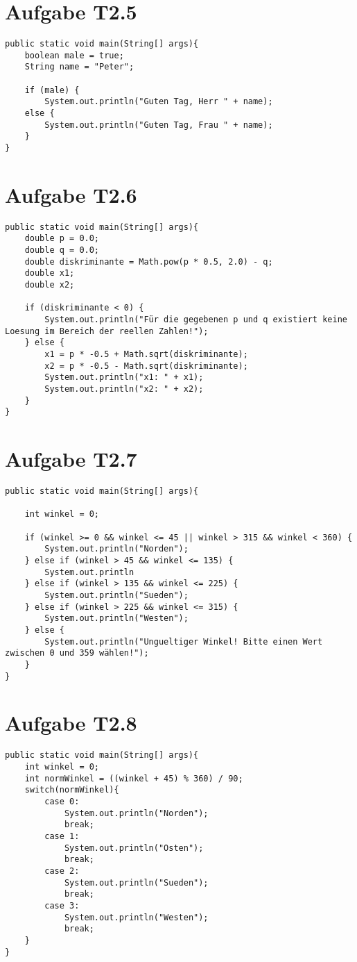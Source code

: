 \documentclass[final,a4paper]{article}
\begin{document}
\section*{Aufgabe T2.5}
\begin{lstlisting}
public static void main(String[] args){
	boolean male = true;
	String name = "Peter";
	
	if (male) {
		System.out.println("Guten Tag, Herr " + name);
	else {
		System.out.println("Guten Tag, Frau " + name);
	}
}
\end{lstlisting}

\section*{Aufgabe T2.6}
\begin{lstlisting}
public static void main(String[] args){
	double p = 0.0;
	double q = 0.0;
	double diskriminante = Math.pow(p * 0.5, 2.0) - q;
	double x1;
	double x2;

	if (diskriminante < 0) {
		System.out.println("Für die gegebenen p und q existiert keine Loesung im Bereich der reellen Zahlen!");
	} else {
		x1 = p * -0.5 + Math.sqrt(diskriminante);
		x2 = p * -0.5 - Math.sqrt(diskriminante);
		System.out.println("x1: " + x1);
		System.out.println("x2: " + x2);
	}
}
\end{lstlisting}

\section*{Aufgabe T2.7}
\begin{lstlisting}
public static void main(String[] args){

	int winkel = 0;

	if (winkel >= 0 && winkel <= 45 || winkel > 315 && winkel < 360) {
		System.out.println("Norden");
	} else if (winkel > 45 && winkel <= 135) {
		System.out.println
	} else if (winkel > 135 && winkel <= 225) {
		System.out.println("Sueden");
	} else if (winkel > 225 && winkel <= 315) {
		System.out.println("Westen");
	} else {
		System.out.println("Ungueltiger Winkel! Bitte einen Wert								 zwischen 0 und 359 wählen!");
	}
}
\end{lstlisting}

\section*{Aufgabe T2.8}
\begin{lstlisting}
public static void main(String[] args){
	int winkel = 0;
	int normWinkel = ((winkel + 45) % 360) / 90;
	switch(normWinkel){
		case 0:
			System.out.println("Norden");
			break;
		case 1:
			System.out.println("Osten");
			break;
		case 2:
			System.out.println("Sueden");
			break;
		case 3:
			System.out.println("Westen");
			break;
	}
}
\end{lstlisting}
\end{document}

